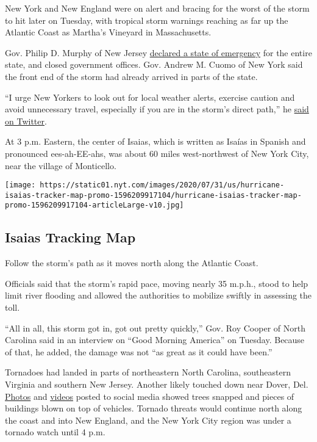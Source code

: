 New York and New England were on alert and bracing for the worst of the
storm to hit later on Tuesday, with tropical storm warnings reaching as
far up the Atlantic Coast as Martha's Vineyard in Massachusetts.

Gov. Philip D. Murphy of New Jersey
\href{https://twitter.com/GovMurphy/status/1290468549232922624}{declared
a state of emergency} for the entire state, and closed government
offices. Gov. Andrew M. Cuomo of New York said the front end of the
storm had already arrived in parts of the state.

``I urge New Yorkers to look out for local weather alerts, exercise
caution and avoid unnecessary travel, especially if you are in the
storm's direct path,'' he
\href{https://twitter.com/NYGovCuomo/status/1290660414666178562}{said on
Twitter}.

At 3 p.m. Eastern, the center of Isaias, which is written as Isaías in
Spanish and pronounced ees-ah-EE-ahs, was about 60 miles west-northwest
of New York City, near the village of Monticello.

\href{https://www.nytimes.com/interactive/2020/07/31/us/hurricane-isaias-tracker-map.html}{}

\texttt{[image: https://static01.nyt.com/images/2020/07/31/us/hurricane-isaias-tracker-map-promo-1596209917104/hurricane-isaias-tracker-map-promo-1596209917104-articleLarge-v10.jpg]}

\hypertarget{isaias-tracking-map}{%
\subsection{Isaias Tracking Map}\label{isaias-tracking-map}}

Follow the storm's path as it moves north along the Atlantic Coast.

Officials said that the storm's rapid pace, moving nearly 35 m.p.h.,
stood to help limit river flooding and allowed the authorities to
mobilize swiftly in assessing the toll.

``All in all, this storm got in, got out pretty quickly,'' Gov. Roy
Cooper of North Carolina said in an interview on ``Good Morning
America'' on Tuesday. Because of that, he added, the damage was not ``as
great as it could have been.''

Tornadoes had landed in parts of northeastern North Carolina,
southeastern Virginia and southern New Jersey. Another likely touched
down near Dover, Del.
\href{https://slack-redir.net/link?url=https\%3A\%2F\%2Ftwitter.com\%2FRichWirdzekWx\%2Fstatus\%2F1290684400825438208}{Photos}
and
\href{https://slack-redir.net/link?url=https\%3A\%2F\%2Ftwitter.com\%2FDKDRinc\%2Fstatus\%2F1290688365830995969}{videos}
posted to social media showed trees snapped and pieces of buildings
blown on top of vehicles. Tornado threats would continue north along the
coast and into New England, and the New York City region was under a
tornado watch until 4 p.m.

